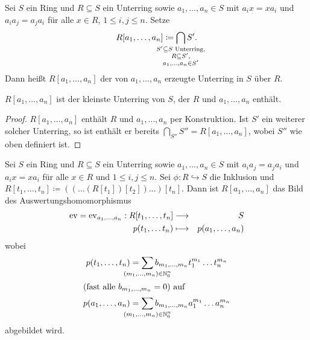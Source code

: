 \documentclass[12pt,a4paper]{scrartcl}
\begin{document}
\begin{defi}
	Sei $S$ ein Ring und $R\subseteq S$ ein Unterring sowie $a_1,\dots,a_n\in S$ mit $a_ix = xa_i$ und $a_ia_j = a_ja_i$ für alle $x\in R$, $1\leq i,j\leq n$. Setze
	\[ R[a_1,\dots,a_n] \coloneqq \bigcap_{\mathclap{\substack{S'\subseteq S \text{ Unterring},\\R\subseteq S',\\ a_1,\dots,a_n\in S'}}}S'.\]
	Dann heißt $R[a_1,\dots,a_n]$ der von $a_1,\dots,a_n$ erzeugte Unterring in $S$ über $R$. 
\end{defi}


\begin{bem}
	$R[a_1,\dots,a_n]$ ist der kleinste Unterring von $S$, der $R$ und $a_1,\dots,a_n$ enthält.
\end{bem}
\begin{proof}
	$R[a_1,\dots,a_n]$ enthält $R$ und $a_1,\dots,a_n$ per Konstruktion.
	Ist $S'$ ein weiterer solcher Unterring, so ist enthält er bereits $\bigcap_{S''}S'' = R[a_1,\dots,a_n]$, wobei $S''$ wie oben definiert ist.
\end{proof}

\begin{satz}\label{thm:evalpolyring}
	Sei $S$ ein Ring und $R\subseteq S$ ein Unterring sowie $a_1,\dots,a_n\in S$ mit $a_ia_j = a_ja_i$ und $a_ix = xa_i$ für alle $x\in R$ und $1\leq i,j\leq n$. Sei $\phi \colon R\hookrightarrow S$ die Inklusion und $R[t_1,\dots, t_n] \coloneqq ((\dots(R[t_1])[t_2])\dots)[t_n]$. Dann ist $R[a_1,\dots,a_n]$ das Bild des Auswertungshomomorphismus 
	\begin{eqnarray*}
		\operatorname{ev} = \operatorname{ev}_{a_1,\dots,a_n}: R[t_1,\dots,t_n] & \longrightarrow & S\\
		p(t_1,\dots t_n) & \longmapsto & p(a_1, \dots, a_n)
	\end{eqnarray*}
	wobei
	\begin{align*}
		p (t_1,\dots, t_n) &= \sum_{\mathclap{(m_1,\dots,m_n)\in\IN_{0}^n}}b_{m_1,\dots,m_n} t_1^{m_1} \dots t_n^{m_n} \\
		\intertext{(fast alle $b_{m_1,\dots,m_n} = 0$) auf}
		p(a_1,\dots, a_n ) &= \sum_{\mathclap{(m_1,\dots, m_n)\in \IN_0^n}} b_{m_1,\dots,m_n} a_1^{m_1}\dots a_n^{m_n}
	\end{align*}
	abgebildet wird.
\end{satz}
\end{document}
